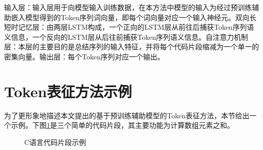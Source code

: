 输入层：输入层用于向模型输入训练数据，在本方法中模型的输入为经过预训练辅助嵌入模型得到的Token序列词向量，即每个词向量对应一个输入神经元。双向长短时记忆层：由两层LSTM构成，一个正向的LSTM层从前往后捕获Token序列语义信息，一个反向的LSTM层从后往前捕获Token序列语义信息。自注意力机制层：本层的主要目的是总结序列的输入特征，并将每个代码片段缩减为一个单一的密集向量。输出层：每个Token序列对应一个输出。

\section{Token表征方法示例}
\label{sec:Tokenachieve}

为了更形象地描述本文提出的基于预训练辅助模型的Token表征方法，本节给出一个示例。下图\ref{fig:code}是三个简单的代码片段，其主要功能为计算数组元素之和。

\begin{figure}[htp] 
  \centering  %
  \caption{C语言代码片段示例}    %
  \label{fig:code}    %
\end{figure}

